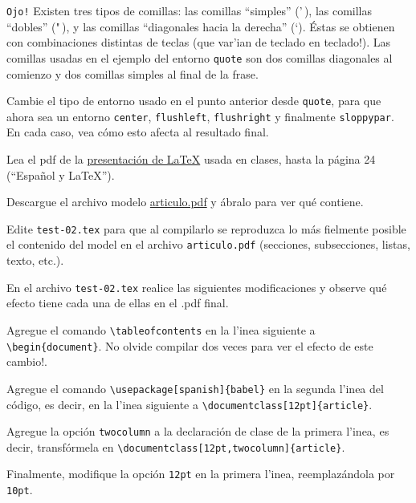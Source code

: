 \documentclass[11pt]{exam}
\begin{document}
\begin{questions}
\texttt{Ojo!} Existen tres tipos de comillas: 	las comillas ``simples'' ('\,), las comillas ``dobles'' ("\,), y las comillas ``diagonales hacia la derecha'' (`). Éstas se obtienen con combinaciones distintas de teclas (que var'ian de teclado en teclado!). Las comillas usadas en el ejemplo del entorno \texttt{quote} son dos comillas diagonales al comienzo y dos comillas simples al final de la frase.


\item Cambie el tipo de entorno usado en el punto anterior desde \texttt{quote}, para que ahora sea un entorno \texttt{center}, \texttt{flushleft}, \texttt{flushright} y finalmente \texttt{sloppypar}. En cada caso, vea cómo esto afecta al resultado final.

\item Lea el pdf de la \href{https://udec.instructure.com/courses/51022/pages/latex-pdf-presentacion?module_item_id=1904611}{presentación de \LaTeX} usada en clases, hasta la página 24 (``Espa\~nol y \LaTeX'').

\item Descargue el archivo modelo \href{https://github.com/gfrubi/CC/blob/master/guias/03/articulo.pdf}{articulo.pdf} y ábralo para ver qué contiene. 


\item Edite \texttt{test-02.tex} para que al compilarlo se reproduzca lo más fielmente posible el contenido del model en el archivo \texttt{articulo.pdf} (secciones, subsecciones, listas, texto, etc.).

\item En el archivo \texttt{test-02.tex} realice las siguientes modificaciones y observe qué efecto tiene cada una de ellas en el .pdf final.
\begin{parts}
\item Agregue el comando \verb|\tableofcontents| en la l'inea siguiente a \verb|\begin{document}|. No olvide compilar dos veces para ver el efecto de este cambio!.
\item Agregue el comando \verb|\usepackage[spanish]{babel}| en la segunda l'inea del código, es decir, en la l'inea siguiente a \verb|\documentclass[12pt]{article}|.
\item Agregue la opción \verb|twocolumn| a la declaración de clase de la primera l'inea, es decir, transfórmela en \verb|\documentclass[12pt,twocolumn]{article}|.
\item Finalmente, modifique la opción \verb|12pt| en la primera l'inea, reemplazándola por \verb|10pt|.
\end{parts}


\end{questions}
\end{document}
